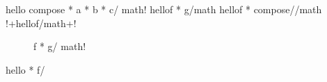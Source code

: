 \documentclass[12pt]{report}
\begin{document}

\obeylines
hello \lcapp compose * a * b * c/ math!
hello\lcapp f * g/math
hello\lcapp f * {\lcname compose/}/math
!+hello\lcapp f/math+!

\begin{figure}
  \caption{\lcapp f * g/ math!}
\end{figure}
\begin{AVerb}
  \lcapp hello * f/
\end{AVerb}
\end{document}
